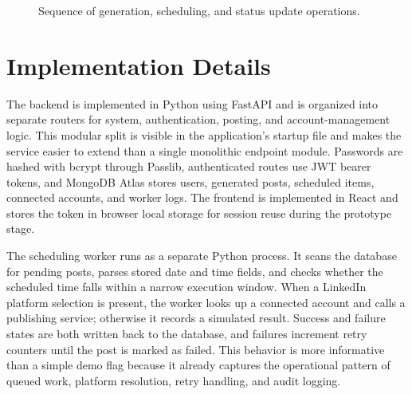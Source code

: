 \documentclass[conference]{IEEEtran}
\begin{document}
\begin{figure}[!t]
\centering
{}
\caption{Sequence of generation, scheduling, and status update operations.}
\label{fig:workflow}
\end{figure}

\section{Implementation Details}

The backend is implemented in Python using FastAPI and is organized into separate routers for system, authentication, posting, and account-management logic. This modular split is visible in the application's startup file and makes the service easier to extend than a single monolithic endpoint module. Passwords are hashed with bcrypt through Passlib, authenticated routes use JWT bearer tokens, and MongoDB Atlas stores users, generated posts, scheduled items, connected accounts, and worker logs. The frontend is implemented in React and stores the token in browser local storage for session reuse during the prototype stage.

The scheduling worker runs as a separate Python process. It scans the database for pending posts, parses stored date and time fields, and checks whether the scheduled time falls within a narrow execution window. When a LinkedIn platform selection is present, the worker looks up a connected account and calls a publishing service; otherwise it records a simulated result. Success and failure states are both written back to the database, and failures increment retry counters until the post is marked as failed. This behavior is more informative than a simple demo flag because it already captures the operational pattern of queued work, platform resolution, retry handling, and audit logging.
\end{document}

